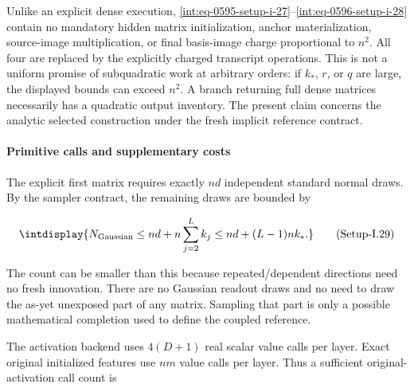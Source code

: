 
Unlike an explicit dense execution, \hyperref[int:eq-setup-i-27]{\eqref{int:eq-0595-setup-i-27}}--\allowbreak \hyperref[int:eq-setup-i-28]{\eqref{int:eq-0596-setup-i-28}} contain no mandatory hidden matrix initialization, anchor materialization, source-image multiplication, or final basis-image charge proportional to \(n^2\). All four are replaced by the explicitly charged transcript operations. This is not a uniform promise of subquadratic work at arbitrary orders: if \(k_*\), \(r\), or \(q\) are large, the displayed bounds can exceed \(n^2\). A branch returning full dense matrices necessarily has a quadratic output inventory. The present claim concerns the analytic selected construction under the fresh implicit reference contract.


\paragraph{Primitive calls and supplementary costs}
\label{int:setup-implicit-6}
\mbox{}\par\smallskip


The explicit first matrix requires exactly \(nd\) independent standard normal draws. By the sampler contract, the remaining draws are bounded by


\label{int:eq-setup-i-29}
\begingroup\renewcommand{\theHequation}{intdisplay.1113}
\begin{equation}
\intdisplay{
N_{\rm Gaussian}\le nd+n\sum_{j=2}^Lk_j
                 \le nd+(L-1)nk_*.
}
\tag{Setup-I.29}
\label{int:eq-0597-setup-i-29}
\end{equation}
\endgroup


The count can be smaller than this because repeated/dependent directions need no fresh innovation. There are no Gaussian readout draws and no need to draw the as-yet unexposed part of any matrix. Sampling that part is only a possible mathematical completion used to define the coupled reference.



The activation backend uses \(4(D+1)\) real scalar value calls per layer. Exact original initialized features use \(nm\) value calls per layer. Thus a sufficient original-activation call count is


